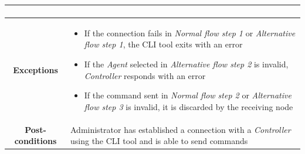 \documentclass[12pt,a4paper,table]{article}
\begin{document}
\begin{longtable}{ |c|p{11.8cm}| }
{\begin{enumerate}
                    \end{enumerate}
                }\\ \hline
                \cellcolor[gray]{0.9} \textbf{Exceptions} & 
                    \begin{itemize}
                        \item If the connection fails in \textit{Normal flow step 1} or \textit{Alternative flow step 1}, the CLI tool exits with an error
                        \item If the \textit{Agent} selected in \textit{Alternative flow step 2} is invalid, \textit{Controller} responds with an error
                        \item If the command sent in \textit{Normal flow step 2} or \textit{Alternative flow step 3} is invalid, it is discarded by the receiving node
                    \end{itemize}\\ \hline
                \cellcolor[gray]{0.9} \textbf{Post-conditions} & Administrator has established a connection with a \textit{Controller} using the CLI tool and is able to send commands\\ \hline
            \end{longtable}
\end{document}
